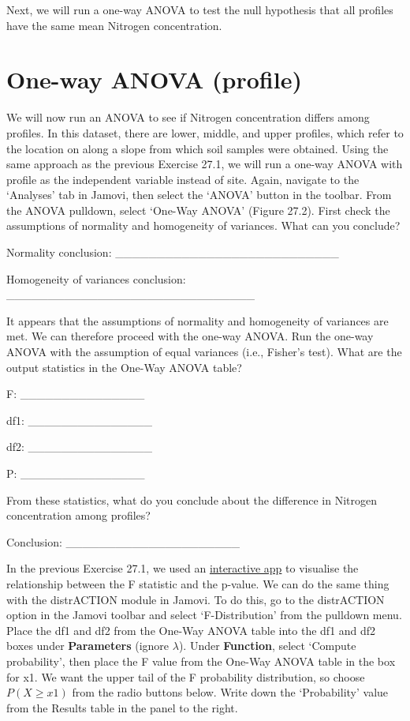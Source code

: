 \documentclass[
]{scrbook}
\begin{document}
Next, we will run a one-way ANOVA to test the null hypothesis that all profiles have the same mean Nitrogen concentration.

\hypertarget{one-way-anova-profile}{%
\section{One-way ANOVA (profile)}\label{one-way-anova-profile}}

We will now run an ANOVA to see if Nitrogen concentration differs among profiles.
In this dataset, there are lower, middle, and upper profiles, which refer to the location on along a slope from which soil samples were obtained.
Using the same approach as the previous Exercise 27.1, we will run a one-way ANOVA with profile as the independent variable instead of site.
Again, navigate to the `Analyses' tab in Jamovi, then select the `ANOVA' button in the toolbar.
From the ANOVA pulldown, select `One-Way ANOVA' (Figure 27.2).
First check the assumptions of normality and homogeneity of variances.
What can you conclude?

Normality conclusion: \_\_\_\_\_\_\_\_\_\_\_\_\_\_\_\_\_\_\_\_\_\_\_\_\_\_\_

Homogeneity of variances conclusion: \_\_\_\_\_\_\_\_\_\_\_\_\_\_\_\_\_\_\_\_\_\_\_\_\_\_\_\_\_\_

It appears that the assumptions of normality and homogeneity of variances are met.
We can therefore proceed with the one-way ANOVA.
Run the one-way ANOVA with the assumption of equal variances (i.e., Fisher's test).
What are the output statistics in the One-Way ANOVA table?

F: \_\_\_\_\_\_\_\_\_\_\_\_\_\_\_

df1: \_\_\_\_\_\_\_\_\_\_\_\_\_\_\_

df2: \_\_\_\_\_\_\_\_\_\_\_\_\_\_\_

P: \_\_\_\_\_\_\_\_\_\_\_\_\_\_\_

From these statistics, what do you conclude about the difference in Nitrogen concentration among profiles?

Conclusion: \_\_\_\_\_\_\_\_\_\_\_\_\_\_\_\_\_\_\_\_\_

In the previous Exercise 27.1, we used an \href{https://bradduthie.shinyapps.io/f_distribution/}{interactive app} to visualise the relationship between the F statistic and the p-value.
We can do the same thing with the distrACTION module in Jamovi.
To do this, go to the distrACTION option in the Jamovi toolbar and select `F-Distribution' from the pulldown menu.
Place the df1 and df2 from the One-Way ANOVA table into the df1 and df2 boxes under \textbf{Parameters} (ignore \(\lambda\)).
Under \textbf{Function}, select `Compute probability', then place the F value from the One-Way ANOVA table in the box for x1.
We want the upper tail of the F probability distribution, so choose \(P(X \geq x1)\) from the radio buttons below.
Write down the `Probability' value from the Results table in the panel to the right.
\end{document}
